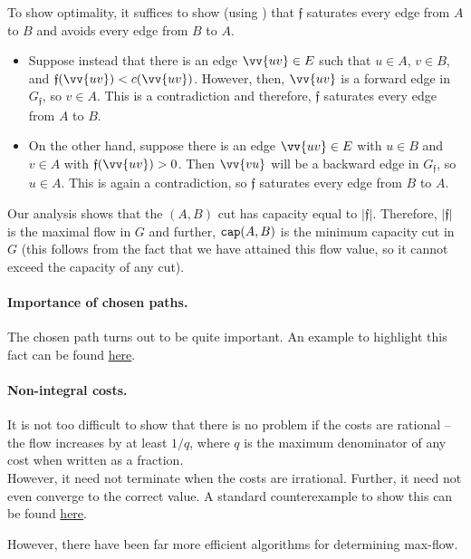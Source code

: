 	To show optimality, it suffices to show (using ) that $\mathfrak{f}$ saturates every edge from $A$ to $B$ and avoids every edge from $B$ to $A$.
	\begin{itemize}
		\item Suppose instead that there is an edge $\vv{uv}\in E$ such that $u\in A$, $v\in B$, and $\mathfrak{f}(\vv{uv}) < c(\vv{uv})$. However, then, $\vv{uv}$ is a forward edge in $G_\mathfrak{f}$, so $v\in A$. This is a contradiction and therefore, $\mathfrak{f}$ saturates every edge from $A$ to $B$.
		\item On the other hand, suppose there is an edge $\vv{uv}\in E$ with $u\in B$ and $v\in A$ with $\mathfrak{f}(\vv{uv})>0$. Then $\vv{vu}$ will be a backward edge in $G_\mathfrak{f}$, so $u\in A$. This is again a contradiction, so $\mathfrak{f}$ saturates every edge from $B$ to $A$.
	\end{itemize}

	Our analysis shows that the $(A,B)$ cut has capacity equal to $|\mathfrak{f}|$. Therefore, $|\mathfrak{f}|$ is the maximal flow in $G$ and further, $\texttt{cap}(A,B)$ is the minimum capacity cut in $G$ (this follows from the fact that we have attained this flow value, so it cannot exceed the capacity of any cut).

	\paragraph{Importance of chosen paths.} The chosen path turns out to be quite important. An example to highlight this fact can be found \href{https://en.wikipedia.org/wiki/Ford%E2%80%93Fulkerson_algorithm#Integral_example}{here}.

	\paragraph{Non-integral costs.} It is not too difficult to show that there is no problem if the costs are rational -- the flow increases by at least $1/q$, where $q$ is the maximum denominator of any cost when written as a fraction.\\
	However, it need not terminate when the costs are irrational. Further, it need not even converge to the correct value. A standard counterexample to show this can be found \href{https://en.wikipedia.org/wiki/Ford%E2%80%93Fulkerson_algorithm#Non-terminating_example}{here}.

	However, there have been far more efficient algorithms for determining max-flow.

